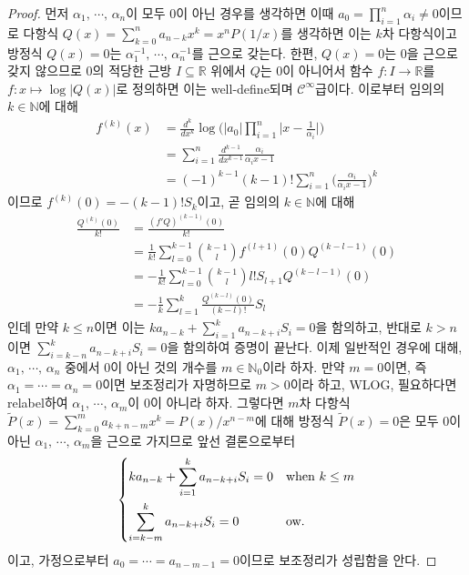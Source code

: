 \begin{proof}
    먼저 $\alpha_1,\,\cdots,\,\alpha_n$이 모두 $0$이 아닌 경우를 생각하면 이때 $a_0=\prod_{i=1}^n\alpha_i\ne0$이므로 다항식 $Q(x)=\sum_{k=0}^na_{n-k}x^k=x^nP(1/x)$를 생각하면 이는 $k$차 다항식이고 방정식 $Q(x)=0$는 $\alpha_1^{-1},\,\cdots,\,\alpha_n^{-1}$를 근으로 갖는다. 한편, $Q(x)=0$는 $0$을 근으로 갖지 않으므로 $0$의 적당한 근방 $I\subseteq\mathbb{R}$ 위에서 $Q$는 $0$이 아니어서 함수 $f:I\to\mathbb{R}$를 $f:x\mapsto\log|Q(x)|$로 정의하면 이는 well-define되며 $\mathcal{C}^\infty$급이다. 이로부터 임의의 $k\in\mathbb{N}$에 대해
    \begin{align*}
        f^{(k)}(x)&=\frac{d^k}{dx^k}\log\bigg(|a_0|\prod_{i=1}^n\bigg|x-\frac{1}{\alpha_i}\bigg|\bigg)\\
        &=\sum_{i=1}^n\frac{d^{k-1}}{dx^{k-1}}\frac{\alpha_i}{\alpha_ix-1}\\
        &=(-1)^{k-1}(k-1)!\sum_{i=1}^n\bigg(\frac{\alpha_i}{\alpha_ix-1}\bigg)^k
    \end{align*}
    이므로 $f^{(k)}(0)=-(k-1)!S_k$이고, 곧 임의의 $k\in\mathbb{N}$에 대해
    \begin{align*}
        \frac{Q^{(k)}(0)}{k!}&=\frac{(f'Q)^{(k-1)}(0)}{k!}\\
        &=\frac{1}{k!}\sum_{l=0}^{k-1}\binom{k-1}{l}f^{(l+1)}(0)Q^{(k-l-1)}(0)\\
        &=-\frac{1}{k!}\sum_{l=0}^{k-1}\binom{k-1}{l}l!S_{l+1}Q^{(k-l-1)}(0)\\
        &=-\frac{1}{k}\sum_{l=1}^k\frac{Q^{(k-l)}(0)}{(k-l)!}S_l
    \end{align*}
    인데 만약 $k\leq n$이면 이는 $ka_{n-k}+\sum_{i=1}^ka_{n-k+i}S_i=0$을 함의하고, 반대로 $k>n$이면 $\sum_{i=k-n}^ka_{n-k+i}S_i=0$을 함의하여 증명이 끝난다. 이제 일반적인 경우에 대해, $\alpha_1,\,\cdots,\,\alpha_n$ 중에서 $0$이 아닌 것의 개수를 $m\in\mathbb{N}_0$이라 하자. 만약 $m=0$이면, 즉 $\alpha_1=\cdots=\alpha_n=0$이면 보조정리가 자명하므로 $m>0$이라 하고, WLOG, 필요하다면 relabel하여 $\alpha_1,\,\cdots,\,\alpha_m$이 $0$이 아니라 하자. 그렇다면 $m$차 다항식 $\widetilde{P}(x)=\sum_{k=0}^ma_{k+n-m}x^k=P(x)/x^{n-m}$에 대해 방정식 $\widetilde{P}(x)=0$은 모두 $0$이 아닌 $\alpha_1,\,\cdots,\,\alpha_m$을 근으로 가지므로 앞선 결론으로부터
    \begin{equation*}
        \begin{dcases*}
            ka_{n-k}+\sum_{i=1}^ka_{n-k+i}S_i=0&when $k\leq m$\\
            \sum_{i=k-m}^ka_{n-k+i}S_i=0&ow.
        \end{dcases*}
    \end{equation*}
    이고, 가정으로부터 $a_0=\cdots=a_{n-m-1}=0$이므로 보조정리가 성립함을 안다.
\end{proof}

